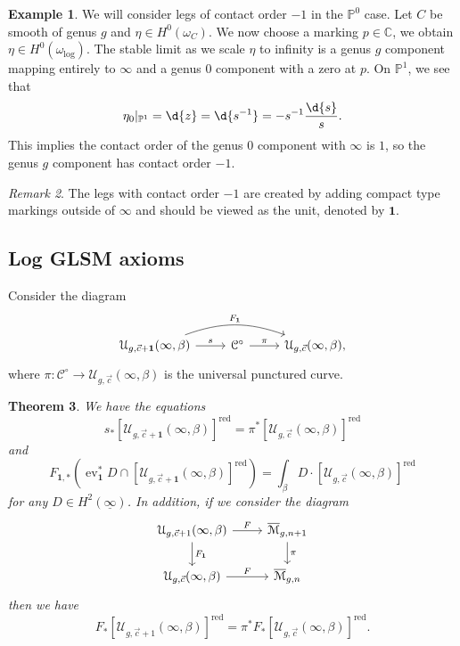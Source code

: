 \documentclass[10pt]{amsart}
\newtheorem{thm}{Theorem}[section]
\theoremstyle{definition}
\newtheorem{exm}[thm]{Example}
\theoremstyle{remark}
\newtheorem{rmk}[thm]{Remark}
\theoremstyle{plain}
\theoremstyle{definition}
\theoremstyle{remark}
\newcommand{\C}{\mathbb{C}}
\renewcommand{\P}{\mathbb{P}}
\newcommand{\Mbar}{\overline{\mathcal{M}}}
\newcommand{\mc}[1]{\mathcal{#1}}
\newcommand{\on}[1]{\operatorname{#1}}
\newcommand{\ul}[1]{\underline{#1}}
\newcommand{\1}{\mathbf{1}}
\newcommand{\2}{\mathbf{2}}
\newcommand{\3}{\mathbf{3}}
\DeclareMathOperator{\ev}{ev}
\begin{document}
\begin{exm}
    We will consider legs of contact order $-1$ in the $\P^0$ case. Let $C$ be smooth of genus $g$ and $\eta \in H^0(\omega_C)$. We now choose a marking $p \in \C$, we obtain $\eta \in H^0(\omega_{\log})$. The stable limit as we scale $\eta$ to infinity is a genus $g$ component mapping entirely to $\infty$ and a genus $0$ component with a zero at $p$. On $\P^1$, we see that
    \[ \eta_0|_{\P^1} = \d{z} = \d{s^{-1}} = -s^{-1} \frac{\d{s}}{s}. \]
    This implies the contact order of the genus $0$ component with $\infty$ is $1$, so the genus $g$ component has contact order $-1$.
\end{exm}

\begin{rmk}
    The legs with contact order $-1$ are created by adding compact type markings outside of $\infty$ and should be viewed as the unit, denoted by $\1$.
\end{rmk}

\subsection{Log GLSM axioms}%
\label{sub:Log GLSM axioms}

Consider the diagram
\begin{equation*}
\begin{tikzcd}
    \mc{U}_{g, \vec{c}+\1}(\infty, \beta) \ar{r}{s} \ar[bend left=20]{rr}{F_{\1}} & \mc{C}^{\circ} \ar{r}{\pi} & \mc{U}_{g, \vec{c}}(\infty, \beta),
\end{tikzcd}
\end{equation*}
where $\pi \colon \mc{C}^{\circ} \to \mc{U}_{g, \vec{c}}(\infty, \beta)$ is the universal punctured curve.

\begin{thm}
    We have the equations
    \[ s_* [\mc{U}_{g, \vec{c}+\1}(\infty, \beta)]^{\on{red}} = \pi^* [\mc{U}_{g, \vec{c}}(\infty, \beta)]^{\on{red}} \]
    and 
    \[ F_{\1, *} (\ev_{\1}^* D \cap [\mc{U}_{g, \vec{c}+\1}(\infty, \beta)]^{\on{red}}) = \int_{\beta} D \cdot [\mc{U}_{g, \vec{c}}(\infty, \beta)]^{\on{red}} \]
    for any $D \in H^2(\ul{\infty})$. In addition, if we consider the diagram
    \begin{equation*}
    \begin{tikzcd}
        \mc{U}_{g, \vec{c}+1}(\infty, \beta) \ar{r}{F} \ar{d}{F_{\1}} & \Mbar_{g,n+1} \ar{d}{\pi} \\
        \mc{U}_{g, \vec{c}}(\infty,\beta) \ar{r}{F} & \Mbar_{g,n}
    \end{tikzcd}
    \end{equation*}
    then we have
    \[ F_* [\mc{U}_{g,\vec{c}+1}(\infty, \beta)]^{\on{red}}= \pi^* F_*[\mc{U}_{g, \vec{c}}(\infty, \beta)]^{\on{red}}. \]
\end{thm}
\end{document}
